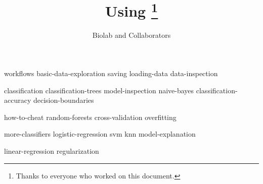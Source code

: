 \documentclass[symmetric, justified, a4paper]{tufte-book}
\title{Using \mutation\thanks{Thanks to everyone who worked on this document.}}
\author[Biolab and Collaborators]{Biolab and Collaborators}
\begin{document}
\frontmatter

\maketitle



\tableofcontents



\mainmatter



{workflows}
{basic-data-exploration}
{saving}
{loading-data}
{data-inspection}


{classification}
{classification-trees}
{model-inspection}
{naive-bayes}
{classification-accuracy}
{decision-boundaries}

{how-to-cheat}
{random-forests}
{cross-validation}
{overfitting}


{more-classifiers}
{logistic-regression}
{svm}
{knn}
{model-explanation}


{linear-regression}
{regularization}
\end{document}
